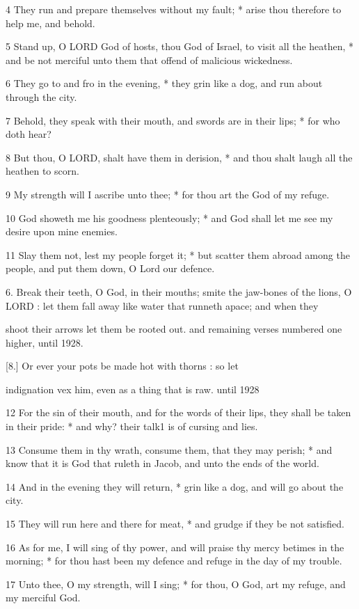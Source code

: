 4 They run and prepare themselves without my fault;
* arise thou therefore to help me, and behold.

5 Stand up, O LORD God of hosts, thou God of Israel,
to visit all the heathen, * and be not merciful unto them that offend
of malicious wickedness.

6 They go to and fro in the evening, * they grin like
a dog, and run about through the city.

7 Behold, they speak with their mouth, and swords are
in their lips; * for who doth hear?

8 But thou, O LORD, shalt have them in derision, *
and thou shalt laugh all the heathen to scorn.

9 My strength will I ascribe unto thee; * for thou
art the God of my refuge.

10 God showeth me his goodness plenteously; * and God
shall let me see my desire upon mine enemies.

11 Slay them not, lest my people forget it; * but scatter
them abroad among the people, and put them down, O Lord our defence.

6. Break their teeth, O
God, in their mouths; smite the jaw-bones of the lions, O LORD
: let them fall away like water that runneth apace; and when they

shoot their arrows let them be rooted out.
and remaining verses numbered one higher, until 1928.

[8.] Or ever your pots be made hot with thorns
: so let 

indignation vex him, even as a thing that is raw.
until 1928

12 For the sin of their mouth, and for the words of their lips, they shall
be taken in their pride: * and why? their talk1 is of cursing
and lies.

13 Consume them in thy wrath, consume them, that they
may perish; * and know that it is God that ruleth in Jacob, and unto the
ends of the world.

14 And in the evening they will return, * grin like
a dog, and will go about the city.

15 They will run here and there for meat, * and grudge
if they be not satisfied.

16 As for me, I will sing of thy power, and will praise
thy mercy betimes in the morning; * for thou hast been my defence and
refuge in the day of my trouble.

17 Unto thee, O my strength, will I sing; * for thou,
O God, art my refuge, and my merciful God.

